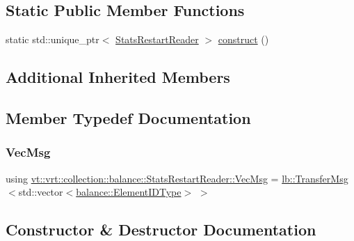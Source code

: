 \subsection*{Static Public Member Functions}
\begin{DoxyCompactItemize}
\item 
static std\+::unique\+\_\+ptr$<$ \hyperlink{structvt_1_1vrt_1_1collection_1_1balance_1_1_stats_restart_reader}{Stats\+Restart\+Reader} $>$ \hyperlink{structvt_1_1vrt_1_1collection_1_1balance_1_1_stats_restart_reader_a5030b1f5ce0f67af68ca4ac43d7f3bd9}{construct} ()
\end{DoxyCompactItemize}
\subsection*{Additional Inherited Members}


\subsection{Member Typedef Documentation}
\mbox{\label{structvt_1_1vrt_1_1collection_1_1balance_1_1_stats_restart_reader_a7e2a74977e595242bf3abb6c83b7e27b}} 
\subsubsection{\texorpdfstring{Vec\+Msg}{VecMsg}}
{\footnotesize\ttfamily using \hyperlink{structvt_1_1vrt_1_1collection_1_1balance_1_1_stats_restart_reader_a7e2a74977e595242bf3abb6c83b7e27b}{vt\+::vrt\+::collection\+::balance\+::\+Stats\+Restart\+Reader\+::\+Vec\+Msg} =  \hyperlink{structvt_1_1vrt_1_1collection_1_1lb_1_1_transfer_msg}{lb\+::\+Transfer\+Msg}$<$std\+::vector$<$\hyperlink{namespacevt_1_1vrt_1_1collection_1_1balance_a14c8d2c972f2913aa3f1636e5be0a120}{balance\+::\+Element\+I\+D\+Type}$>$ $>$}



\subsection{Constructor \& Destructor Documentation}
\mbox{\label{structvt_1_1vrt_1_1collection_1_1balance_1_1_stats_restart_reader_a6813a4a484008c90cc12fb384e20f8c1}} 
